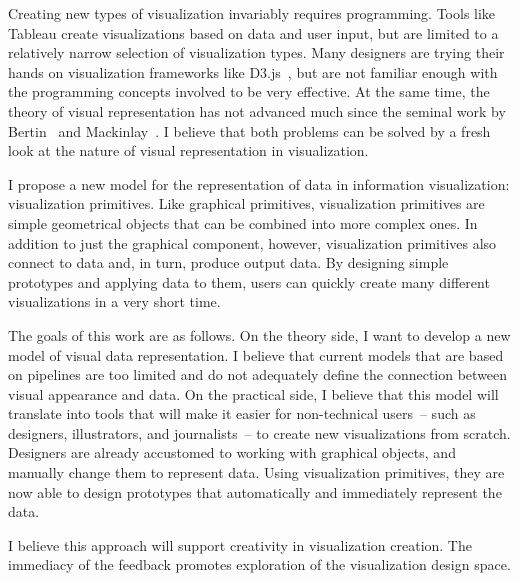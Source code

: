 \label{Intro}

Creating new types of visualization invariably requires programming.
Tools like Tableau create visualizations based on data and user input, but are limited to a relatively narrow selection of visualization types.
Many designers are trying their hands on visualization frameworks like D3.js~\cite{bostock2011d3}, but are not familiar enough with the programming concepts involved to be very effective.
At the same time, the theory of visual representation has not advanced much since the seminal work by Bertin~\cite{bertin1983semiology} and Mackinlay~\cite{Mackinlay1986}.
I believe that both problems can be solved by a fresh look at the nature of visual representation in visualization.

I propose a new model for the representation of data in information visualization: visualization primitives.
Like graphical primitives, visualization primitives are simple geometrical objects that can be combined into more complex ones.
In addition to just the graphical component, however, visualization primitives also connect to data and, in turn, produce output data.
By designing simple prototypes and applying data to them, users can quickly create many different visualizations in a very short time.

The goals of this work are as follows.
On the theory side, I want to develop a new model of visual data representation.
I believe that current models that are based on pipelines are too limited and do not adequately define the connection between visual appearance and data.
On the practical side, I believe that this model will translate into tools that will make it easier for non-technical users~-- such as designers, illustrators, and journalists~-- to create new visualizations from scratch.
Designers are already accustomed to working with graphical objects, and manually change them to represent data.
Using visualization primitives, they are now able to design prototypes that automatically and immediately represent the data.

I believe this approach will support creativity in visualization creation.
The immediacy of the feedback promotes exploration of the visualization design space.

\bodysubsection{}
\label{}